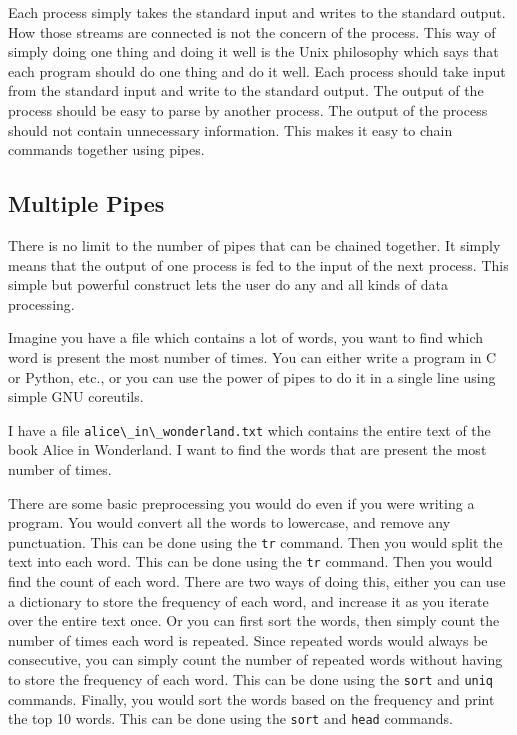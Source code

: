 Each process simply takes the standard input and writes to the standard
output. How those streams are connected is not the concern of the process.
This way of simply doing one thing and doing it well is the Unix philosophy
which says that each program should do one thing and do it well.
Each process should take input from the standard input and write to
the standard output. The output of the process should be easy to
parse by another process. The output of the process should not contain
unnecessary information. This makes it easy to chain commands together
using pipes.

\subsection{Multiple Pipes}

There is no limit to the number of pipes that can be chained together.
It simply means that the output of one process is fed to the input
of the next process. This simple but powerful construct lets the user
do any and all kinds of data processing.

Imagine you have a file which contains a lot of words, you want to
find which word is present the most number of times. You can either
write a program in C or Python, etc., or you can use the power of
pipes to do it in a single line using simple GNU coreutils.

I have a file \lstinline|alice\_in\_wonderland.txt| which contains the
entire text of the book Alice in Wonderland. I want to find the words
that are present the most number of times.

There are some basic preprocessing you would do even if you were writing
a program. You would convert all the words to lowercase, and remove
any punctuation. This can be done using the \lstinline|tr| command.
Then you would split the text into each word. This can be done using
the \lstinline|tr| command. Then you would find the count of each word.
There are two ways of doing this, either you can use a dictionary
to store the frequency of each word, and increase it as you iterate
over the entire text once. Or you can first sort the words, then
simply count the number of times each word is repeated. Since repeated
words would always be consecutive, you can simply count the number
of repeated words without having to store the frequency of each word.
This can be done using the \lstinline|sort| and \lstinline|uniq| commands.
Finally, you would sort the words based on the frequency and print
the top 10 words. This can be done using the \lstinline|sort| and \lstinline|head|
commands.

